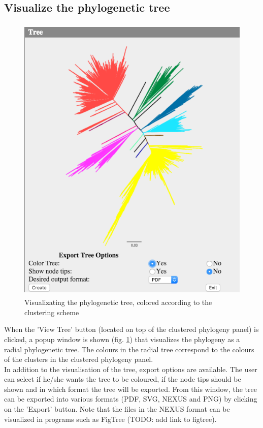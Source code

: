 \documentclass[a4paper, 11pt]{article} %
\begin{document}
\subsection{Visualize the phylogenetic tree}
\begin{figure}[H]
\centering
\includegraphics[width=400pt, height=400pt, keepaspectratio=true]{images/view_tree.PNG}
\caption{Visualizating the phylogenetic tree, colored according to the clustering scheme}
\label{fig:view_tree}
\end{figure}
When the 'View Tree' button (located on top of the clustered phylogeny panel) is clicked, a popup window is shown (fig. \ref{fig:view_tree}) that visualizes the phylogeny as a radial phylogenetic tree. The colours in the radial tree correspond to the colours of the clusters in the clustered phylogeny panel.
\\
In addition to the visualisation of the tree, export options are available. The user can select if he/she wants the tree to be coloured, if the node tips should be shown and in which format the tree will be exported. From this window, the tree can be exported into various formats (PDF, SVG, NEXUS and PNG) by clicking on the 'Export' button. Note that the files in the NEXUS format can be visualized in programs such as FigTree (TODO: add link to figtree).  
\end{document}
